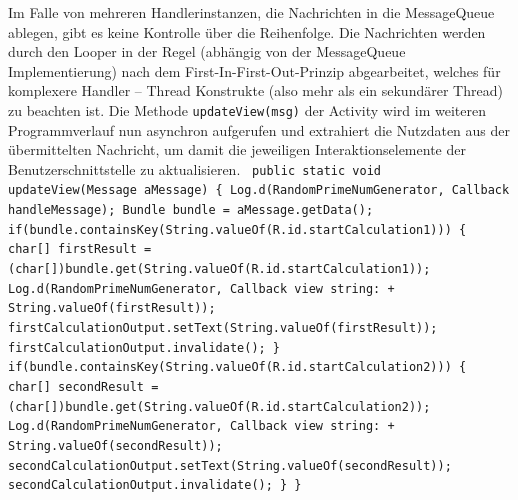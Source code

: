 \documentclass[12pt,oneside,a4paper,bibtotoc,liststotoc]{scrreprt}
\begin{document}
Im Falle von mehreren Handlerinstanzen, die Nachrichten in die MessageQueue ablegen, gibt es keine Kontrolle über die Reihenfolge. Die Nachrichten werden durch den Looper in der Regel (abhängig von der MessageQueue Implementierung) nach dem First-In-First-Out-Prinzip abgearbeitet, welches für komplexere Handler – Thread Konstrukte (also mehr als ein sekundärer Thread) zu beachten ist. Die Methode \texttt{updateView(msg)} der Activity wird im weiteren Programmverlauf nun asynchron aufgerufen und extrahiert die Nutzdaten aus der übermittelten Nachricht, um damit die jeweiligen Interaktionselemente der Benutzerschnittstelle zu aktualisieren.\newline\newline
\texttt{ 
  public static void updateView(Message aMessage)\newline
  \{ \newline
     Log.d(\grqq RandomPrimeNumGenerator\grqq, \grqq Callback handleMessage\grqq);\newline
     Bundle bundle = aMessage.getData();\newline
\newline
     if(bundle.containsKey(String.valueOf(R.id.startCalculation1)))\newline
     \{\newline
        char[] firstResult = (char[])bundle.get(String.valueOf(R.id.startCalculation1));\newline
        Log.d(\grqq RandomPrimeNumGenerator\grqq, \grqq Callback view string: \grqq + String.valueOf(firstResult));\newline
\newline
        firstCalculationOutput.setText(String.valueOf(firstResult));\newline
        firstCalculationOutput.invalidate();\newline
    \}\newline
\newline
     if(bundle.containsKey(String.valueOf(R.id.startCalculation2)))\newline
     \{\newline
        char[] secondResult = (char[])bundle.get(String.valueOf(R.id.startCalculation2));\newline
        Log.d(\grqq RandomPrimeNumGenerator\grqq, \grqq Callback view string: \grqq +                                                                                                                                                                 
      String.valueOf(secondResult));\newline\newline
        secondCalculationOutput.setText(String.valueOf(secondResult));\newline
        secondCalculationOutput.invalidate();\newline
     \}\newline
  \}\newline
}\newline
\end{document}
